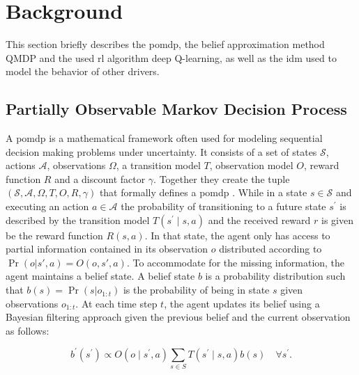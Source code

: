 	
	
	
	\section{Background}
	\label{sec:background}
	This section briefly describes the \gls{pomdp}, the belief approximation method QMDP and the used \gls{rl} algorithm deep Q-learning, as well as the \gls{idm} used to model the behavior of other drivers.  
	
	
	\subsection{Partially Observable Markov Decision Process}
	A \gls{pomdp} is a mathematical framework often used for modeling sequential decision making problems under uncertainty. 
	It consists of a set of states $\mathcal{S}$, actions $\mathcal{A}$, observations $\Omega$, a transition model $T$, observation model $O$, reward function $R$ and a discount factor $\gamma$. 
	Together they create the tuple $(\mathcal{S},\mathcal{A},\Omega,T,O,R,\gamma)$ that formally defines a \gls{pomdp} \cite{Kochenderfer2015}. 
	While in a state $s \in \mathcal{S}$ and executing an action $a \in \mathcal{A}$ the probability of transitioning to a future state $s^\prime$ is described by the transition model $T(s^\prime \mid s,a)$ and the received reward $r$ is given be the reward function $R(s,a)$. 
	In that state, the agent only has access to partial information contained in its observation $o$ distributed according to $\Pr(o | s', a) = O(o, s', a)$.
	To accommodate for the missing information, the agent maintains a belief state. A belief state $b$ is a probability distribution such that $b(s) = \Pr(s | o_{1:t})$ is the probability of being in state $s$ given observations $o_{1:t}$. 
	At each time step $t$, the agent updates its belief using a Bayesian filtering approach given the previous belief and the current observation as follows:
	
	\begin{equation}
		b^\prime(s^\prime) \propto O(o \mid s^\prime, a) \sum_{s \in S}T(s^\prime \mid s,a)b(s) \quad \forall s^\prime.
	\end{equation}
	
